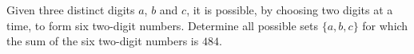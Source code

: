 Given three distinct digits $a$, $b$ and $c$, it is possible, by choosing two digits at a time, to form six two-digit numbers. Determine all possible sets $\{a,b,c\}$ for which the sum of the six two-digit numbers is $484$.
